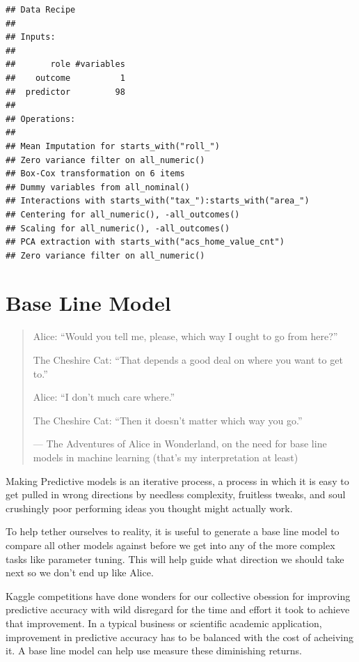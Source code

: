 \documentclass[]{book}
\theoremstyle{definition}
\theoremstyle{definition}
\theoremstyle{definition}
\theoremstyle{remark}
\begin{document}
\begin{verbatim}
## Data Recipe
## 
## Inputs:
## 
##       role #variables
##    outcome          1
##  predictor         98
## 
## Operations:
## 
## Mean Imputation for starts_with("roll_")
## Zero variance filter on all_numeric()
## Box-Cox transformation on 6 items
## Dummy variables from all_nominal()
## Interactions with starts_with("tax_"):starts_with("area_")
## Centering for all_numeric(), -all_outcomes()
## Scaling for all_numeric(), -all_outcomes()
## PCA extraction with starts_with("acs_home_value_cnt")
## Zero variance filter on all_numeric()
\end{verbatim}

\section{Base Line Model}\label{base-line-model}

\begin{quote}
Alice: ``Would you tell me, please, which way I ought to go from here?''

The Cheshire Cat: ``That depends a good deal on where you want to get
to.''

Alice: ``I don't much care where.''

The Cheshire Cat: ``Then it doesn't matter which way you go.''

--- The Adventures of Alice in Wonderland, on the need for base line
models in machine learning (that's my interpretation at least)
\end{quote}

Making Predictive models is an iterative process, a process in which it
is easy to get pulled in wrong directions by needless complexity,
fruitless tweaks, and soul crushingly poor performing ideas you thought
might actually work.

To help tether ourselves to reality, it is useful to generate a base
line model to compare all other models against before we get into any of
the more complex tasks like parameter tuning. This will help guide what
direction we should take next so we don't end up like Alice.

Kaggle competitions have done wonders for our collective obession for
improving predictive accuracy with wild disregard for the time and
effort it took to achieve that improvement. In a typical business or
scientific academic application, improvement in predictive accuracy has
to be balanced with the cost of acheiving it. A base line model can help
use measure these diminishing returns.
\end{document}

